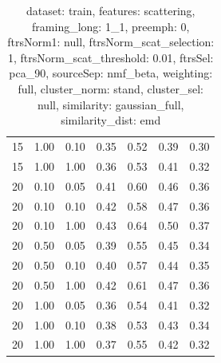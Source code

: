 \begin{table}
\begin{center}
\begin{tabular}{lllcccc}
15 & 1.00 & 0.10 & 0.35 & 0.52 & 0.39 & 0.30 \\ 
15 & 1.00 & 1.00 & 0.36 & 0.53 & 0.41 & 0.32 \\ 
20 & 0.10 & 0.05 & 0.41 & 0.60 & 0.46 & 0.36 \\ 
20 & 0.10 & 0.10 & 0.42 & 0.58 & 0.47 & 0.36 \\ 
20 & 0.10 & 1.00 & 0.43 & 0.64 & 0.50 & 0.37 \\ 
20 & 0.50 & 0.05 & 0.39 & 0.55 & 0.45 & 0.34 \\ 
20 & 0.50 & 0.10 & 0.40 & 0.57 & 0.44 & 0.35 \\ 
20 & 0.50 & 1.00 & 0.42 & 0.61 & 0.47 & 0.36 \\ 
20 & 1.00 & 0.05 & 0.36 & 0.54 & 0.41 & 0.32 \\ 
20 & 1.00 & 0.10 & 0.38 & 0.53 & 0.43 & 0.34 \\ 
20 & 1.00 & 1.00 & 0.37 & 0.55 & 0.42 & 0.32 \\ 
\end{tabular} 
\end{center} 
\caption{dataset: train, features: scattering, framing\_long: 1\_1, preemph: 0, ftrsNorm1: null, ftrsNorm\_scat\_selection: 1, ftrsNorm\_scat\_threshold: 0.01, ftrsSel: pca\_90, sourceSep: nmf\_beta, weighting: full, cluster\_norm: stand, cluster\_sel: null, similarity: gaussian\_full, similarity\_dist: emd} 
\label{datasetrFeaturscFraminlong1_1Preemp0Ftrsnorm1nuFtrsnoscatselect1Ftrsnoscatthresh0.01Ftrsselpc90SourcesepnmbeWeightfuClustenormstClusteselnuSimilagafuSimiladistem} 
\end{table} 
 
